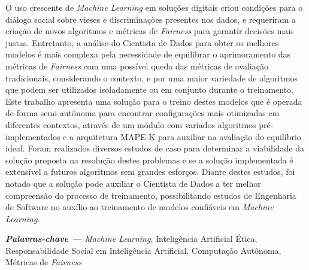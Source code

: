 \documentclass[portugues]{ic-tese}
\providecommand{\palavraschave}[1]
{
  \small	
  \textbf{\textit{Palavras-chave ---}} #1
}
\begin{document}
\begin{resumo}
O uso crescente de \textit{Machine Learning} em soluções digitais criou condições para o diálogo social sobre vieses e discriminações presentes nos dados, e requeriram a criação de novos algoritmos e métricas de \textit{Fairness} para garantir decisões mais justas. Entretanto, a análise do Cientista de Dados para obter os melhores modelos é mais complexa pela necessidade de equilibrar o aprimoramento das métricas de \textit{Fairness} com uma possível queda das métricas de avaliação tradicionais, considerando o contexto, e por uma maior variedade de algoritmos que podem ser utilizados isoladamente ou em conjunto durante o treinamento. Este trabalho apresenta uma solução para o treino destes modelos que é operada de forma semi-autônoma para encontrar configurações mais otimizadas em diferentes contextos, através de um módulo com variados algoritmos pré-implementados e a arquitetura MAPE-K para auxiliar na avaliação do equilíbrio ideal. Foram realizados diversos estudos de caso para determinar a viabilidade da solução proposta na resolução destes problemas e se a solução implementada é extensível a futuros algoritmos sem grandes esforços. Diante destes estudos, foi notado que a solução pode auxiliar o Cientista de Dados a ter melhor compreensão do processo de treinamento, possibilitando estudos de Engenharia de Software no auxílio ao treinamento de modelos confiáveis em \textit{Machine Learning}.

\palavraschave{\textit{Machine Learning}, Inteligência Artificial Ética, Responsabilidade Social em Inteligência Artificial, Computação Autônoma, Métricas de \textit{Fairness}}
\end{resumo}
\end{document}
